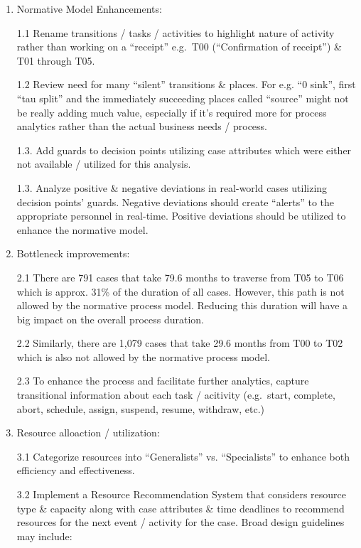 \documentclass[]{article}
\begin{document}
\begin{enumerate}
\def\labelenumi{\arabic{enumi}.}
\item
  Normative Model Enhancements:

  1.1 Rename transitions / tasks / activities to highlight nature of
  activity rather than working on a ``receipt'' e.g.~T00 (``Confirmation
  of receipt'') \& T01 through T05.

  1.2 Review need for many ``silent'' transitions \& places. For e.g.
  ``0 sink'', first ``tau split'' and the immediately succeeding places
  called ``source'' might not be really adding much value, especially if
  it's required more for process analytics rather than the actual
  business needs / process.

  1.3. Add guards to decision points utilizing case attributes which
  were either not available / utilized for this analysis.

  1.3. Analyze positive \& negative deviations in real-world cases
  utilizing decision points' guards. Negative deviations should create
  ``alerts'' to the appropriate personnel in real-time. Positive
  deviations should be utilized to enhance the normative model.
\item
  Bottleneck improvements:

  2.1 There are 791 cases that take 79.6 months to traverse from T05 to
  T06 which is approx. 31\% of the duration of all cases. However, this
  path is not allowed by the normative process model. Reducing this
  duration will have a big impact on the overall process duration.

  2.2 Similarly, there are 1,079 cases that take 29.6 months from T00 to
  T02 which is also not allowed by the normative process model.

  2.3 To enhance the process and facilitate further analytics, capture
  transitional information about each task / acitivity (e.g.~start,
  complete, abort, schedule, assign, suspend, resume, withdraw, etc.)
\item
  Resource alloaction / utilization:

  3.1 Categorize resources into ``Generalists'' vs. ``Specialists'' to
  enhance both efficiency and effectiveness.

  3.2 Implement a Resource Recommendation System that considers resource
  type \& capacity along with case attributes \& time deadlines to
  recommend resources for the next event / activity for the case. Broad
  design guidelines may include:


\end{enumerate}
\end{document}
